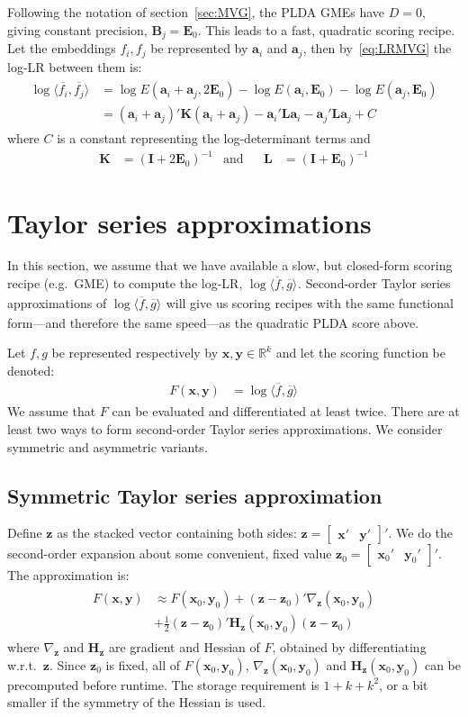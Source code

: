 \documentclass[a4paper,oneside,12pt,english]{report}
\def\zvec{\mathbf{z}}
\def\expv#1#2{\bigl\langle#1\bigr\rangle_{#2}}
\def\R{\mathbb{R}}
\def\Lmat{\mathbf{L}}
\def\Bmat{\mathbf{B}}
\def\Hmat{\mathbf{H}}
\def\Emat{\mathbf{E}}
\def\Imat{\mathbf{I}}
\def\Kmat{\mathbf{K}}
\def\yvec{\mathbf{y}}
\def\xvec{\mathbf{x}}
\def\avec{\mathbf{a}}
\def\dot#1#2{\expv{#1,#2}{}}
\def\normal#1{\overline{#1}}
\def\dotn#1#2{\dot{\normal{#1}}{\normal{#2}}}
\def\bmat#1{\begin{bmatrix}#1\end{bmatrix}}
\begin{document}
Following the notation of section~\ref{sec:MVG}, the PLDA GMEs have $D=0$, giving constant precision, $\Bmat_j=\Emat_0$. This leads to a fast, quadratic scoring recipe. Let the embeddings $f_i,f_j$ be represented by $\avec_i$ and $\avec_j$, then by~\eqref{eq:LRMVG} the log-LR between them is:
\begin{align}
\label{eq:PLDAscore}
\begin{split}
\log\dotn{f_i}{f_j} &=\log E(\avec_i+\avec_j,2\Emat_0)  -\log E(\avec_i,\Emat_0) -\log E(\avec_j,\Emat_0) \\
&= (\avec_i+\avec_j)' \Kmat (\avec_i+\avec_j)
-\avec_i' \Lmat \avec_i -\avec_j' \Lmat \avec_j + C
\end{split}
\end{align} 
where $C$ is a constant representing the log-determinant terms and
\begin{align}
\Kmat &= (\Imat+2\Emat_0)^{-1}&\text{and} && \Lmat &=(\Imat+\Emat_0)^{-1}
\end{align}

\section{Taylor series approximations}
\label{sec:TSapr}
In this section, we assume that we have available a slow, but closed-form scoring recipe (e.g.\ GME) to compute the log-LR, $\log\dotn{f}{g}$. Second-order Taylor series approximations of $\log\dotn{f}{g}$ will give us scoring recipes with the same functional form---and therefore the same speed---as the quadratic PLDA score above. 

Let $f,g$ be represented respectively by $\xvec,\yvec\in\R^k$ and let the scoring function be denoted: 
\begin{align}
F(\xvec,\yvec) &= \log\dotn{f}{g}
\end{align} 
We assume that $F$ can be evaluated and differentiated at least twice. There are at least two ways to form second-order Taylor series approximations. We consider symmetric and asymmetric variants.

\subsection{Symmetric Taylor series approximation}
Define $\zvec$ as the stacked vector containing both sides: $\zvec=\bmat{\xvec'&\yvec'}'$. We do the second-order expansion about some convenient, fixed value $\zvec_0=\bmat{\xvec_0'&\yvec_0'}'$. The approximation is:
\begin{align}
\begin{split}
F(\xvec,\yvec) &\approx F(\xvec_0,\yvec_0) + (\zvec-\zvec_0)'\nabla_\zvec(\xvec_0,\yvec_0)\\ 
&+ \frac12(\zvec-\zvec_0)'\Hmat_\zvec(\xvec_0,\yvec_0)(\zvec-\zvec_0)
\end{split}
\end{align} 
where $\nabla_\zvec$ and $\Hmat_\zvec$ are gradient and Hessian of $F$, obtained by differentiating w.r.t.\ $\zvec$. Since $\zvec_0$ is fixed, all of $F(\xvec_0,\yvec_0)$, $\nabla_\zvec(\xvec_0,\yvec_0)$ and $\Hmat_\zvec(\xvec_0,\yvec_0)$ can be precomputed before runtime. The storage requirement is $1 + k + k^2$, or a bit smaller if the symmetry of the Hessian is used.
\end{document}
